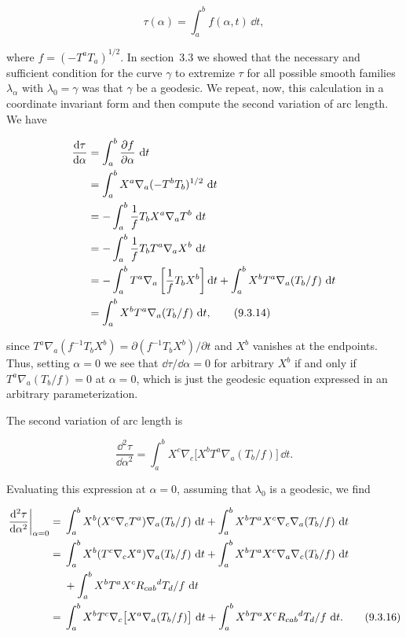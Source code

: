\begin{equation}
  \tau(\alpha)=\int_a^b f(\alpha,t)\,\dd t ,
  \tag{9.3.13}\label{eq:9.3.13}
\end{equation}

where \(f=(-T^aT_a)^{1/2}\). In section~3.3 we showed that the necessary and
sufficient condition for the curve \(\gamma\) to extremize \(\tau\) for all possible
smooth families \(\lambda_\alpha\) with \(\lambda_0=\gamma\) was that \(\gamma\) be a
geodesic. We repeat, now, this calculation in a coordinate invariant form and then
compute the second variation of arc length. We have

\begin{align}
  \frac{\dd\tau}{\dd\alpha}
    &=\int_a^b\frac{\partial f}{\partial\alpha}\,\dd t\notag\\
    &=\int_a^bX^a\nabla_a(-T^bT_b)^{1/2}\,\dd t\notag\\
    &=-\int_a^b\frac1fT_bX^a\nabla_aT^b\,\dd t\notag\\
    &=-\int_a^b\frac1fT_bT^a\nabla_aX^b\,\dd t\notag\\
    &=-\int_a^bT^a\nabla_a\left[\frac1fT_bX^b\right]\dd t
      +\int_a^bX^bT^a\nabla_a(T_b/f)\,\dd t\notag\\
    &=\int_a^bX^bT^a\nabla_a(T_b/f)\,\dd t ,
  \tag{9.3.14}\label{eq:9.3.14}
\end{align}

since \(T^a\nabla_a(f^{-1}T_bX^b)=\partial(f^{-1}T_bX^b)/\partial t\) and \(X^b\)
vanishes at the endpoints. Thus, setting \(\alpha=0\) we see that
\(\dd\tau/\dd\alpha=0\) for arbitrary \(X^b\) if and only if
\(T^a\nabla_a(T_b/f)=0\) at \(\alpha=0\), which is just the geodesic equation
expressed in an arbitrary parameterization.

The second variation of arc length is

\begin{equation}
  \frac{\dd^2\tau}{\dd\alpha^2}
  =\int_a^bX^c\nabla_c\bigl[X^bT^a\nabla_a(T_b/f)\bigr]\,\dd t .
  \tag{9.3.15}\label{eq:9.3.15}
\end{equation}

Evaluating this expression at \(\alpha=0\), assuming that \(\lambda_0\) is a geodesic,
we find

\begin{align}
  \left.\frac{\dd^2\tau}{\dd\alpha^2}\right|_{\alpha=0}
    ={}&\int_a^bX^b(X^c\nabla_cT^a)\nabla_a(T_b/f)\,\dd t
       +\int_a^bX^bT^aX^c\nabla_c\nabla_a(T_b/f)\,\dd t\notag\\
    ={}&\int_a^bX^b(T^c\nabla_cX^a)\nabla_a(T_b/f)\,\dd t
       +\int_a^bX^bT^aX^c\nabla_a\nabla_c(T_b/f)\,\dd t\notag\\
      &+\int_a^bX^bT^aX^cR_{cab}{}^dT_d/f\,\dd t\notag\\
    ={}&\int_a^bX^bT^c\nabla_c\bigl[X^a\nabla_a(T_b/f)\bigr]\,\dd t
       +\int_a^bX^bT^aX^cR_{cab}{}^dT_d/f\,\dd t .
  \tag{9.3.16}\label{eq:9.3.16}
\end{align}

